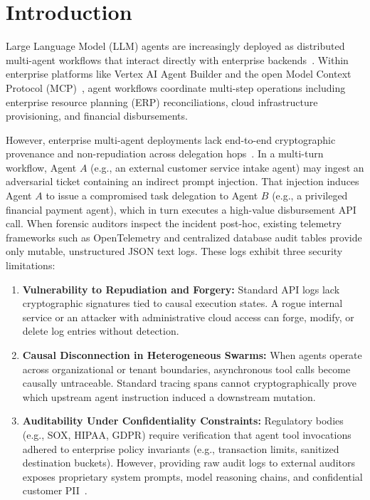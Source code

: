 \documentclass[conference,10pt]{IEEEtran}
\begin{document}
\section{Introduction}
Large Language Model (LLM) agents are increasingly deployed as distributed multi-agent workflows that interact directly with enterprise backends~\cite{brown2020language, achiam2023gpt4, team2023gemini}. Within enterprise platforms like Vertex AI Agent Builder and the open Model Context Protocol (MCP)~\cite{mcp2024spec}, agent workflows coordinate multi-step operations including enterprise resource planning (ERP) reconciliations, cloud infrastructure provisioning, and financial disbursements.

However, enterprise multi-agent deployments lack end-to-end cryptographic provenance and non-repudiation across delegation hops~\cite{greshake2023not, debenedetti2024agentdojo, zhan2024injecagent}. In a multi-turn workflow, Agent $A$ (e.g., an external customer service intake agent) may ingest an adversarial ticket containing an indirect prompt injection. That injection induces Agent $A$ to issue a compromised task delegation to Agent $B$ (e.g., a privileged financial payment agent), which in turn executes a high-value disbursement API call. When forensic auditors inspect the incident post-hoc, existing telemetry frameworks such as OpenTelemetry and centralized database audit tables provide only mutable, unstructured JSON text logs. These logs exhibit three security limitations:
\begin{enumerate}
    \item \textbf{Vulnerability to Repudiation and Forgery:} Standard API logs lack cryptographic signatures tied to causal execution states. A rogue internal service or an attacker with administrative cloud access can forge, modify, or delete log entries without detection.
    \item \textbf{Causal Disconnection in Heterogeneous Swarms:} When agents operate across organizational or tenant boundaries, asynchronous tool calls become causally untraceable. Standard tracing spans cannot cryptographically prove which upstream agent instruction induced a downstream mutation.
    \item \textbf{Auditability Under Confidentiality Constraints:} Regulatory bodies (e.g., SOX, HIPAA, GDPR) require verification that agent tool invocations adhered to enterprise policy invariants (e.g., transaction limits, sanitized destination buckets). However, providing raw audit logs to external auditors exposes proprietary system prompts, model reasoning chains, and confidential customer PII~\cite{goldwasser1989knowledge}.
\end{enumerate}
\end{document}
